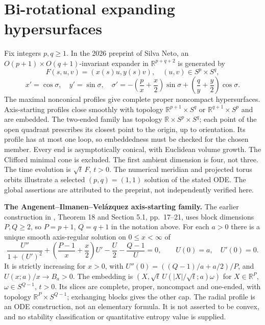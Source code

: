\chapter{Bi-rotational expanding hypersurfaces}\label{sec:catalogue-birotational-expanders}
\begin{example}\label{ex:catalogue-birotational-expanders}
Fix integers $p,q\ge1$. In the 2026 preprint of Silva Neto, an $O(p+1)\times O(q+1)$-invariant expander in $\mathbb R^{p+q+2}$ is generated by
\[
 F(s,u,v)=(x(s)u,y(s)v),\quad (u,v)\in S^p\times S^q,
\]
\[
 x'=\cos\sigma,\quad y'=\sin\sigma,\quad
 \sigma'=-\left(\frac p x+\frac x2\right)\sin\sigma+
           \left(\frac q y+\frac y2\right)\cos\sigma.
\]
The maximal nonconical profiles give complete proper noncompact hypersurfaces. Axis-starting profiles close smoothly with topology $\mathbb R^{p+1}\times S^q$ or $\mathbb R^{q+1}\times S^p$ and are embedded. The two-ended family has topology $\mathbb R\times S^p\times S^q$; each point of the open quadrant prescribes its closest point to the origin, up to orientation. Its profile has at most one loop, so embeddedness must be checked for the chosen member. Every end is asymptotically conical, with Euclidean volume growth. The Clifford minimal cone is excluded.
The first ambient dimension is four, not three. The time evolution is $\sqrt t\,F$, $t>0$. The numerical meridian and projected torus orbits illustrate a selected $(p,q)=(1,1)$ solution of the stated ODE. The global assertions are attributed to the preprint, not independently verified here.

\par\textbf{The Angenent--Ilmanen--Vel\'azquez axis-starting family.}
The earlier construction in \cite{CatAIV2002}, Theorem 18 and Section 5.1, pp.~17--21, uses block dimensions $P,Q\geq2$, so $P=p+1$, $Q=q+1$ in the notation above. For each $a>0$ there is a unique smooth axis-regular solution on $0\leq x<\infty$ of
\[
 \frac{U''}{1+(U')^2}+\left(\frac{P-1}{x}+\frac x2\right)U'
 -\frac U2-\frac{Q-1}{U}=0,\qquad U(0)=a,\quad U'(0)=0.
\]
It is strictly increasing for $x>0$, with $U''(0)=((Q-1)/a+a/2)/P$, and $U(x;a)/x\to B_a>0$. The embedding is $(X,\sqrt t\,U(|X|/\sqrt t;a)\omega)$ for $X\in\mathbb R^P$, $\omega\in S^{Q-1}$, $t>0$. Its slices are complete, proper, noncompact and one-ended, with topology $\mathbb R^P\times S^{Q-1}$; exchanging blocks gives the other cap. The radial profile is an ODE construction, not an elementary formula. It is not asserted to be convex, and no stability classification or quantitative entropy value is supplied.


\end{example}

